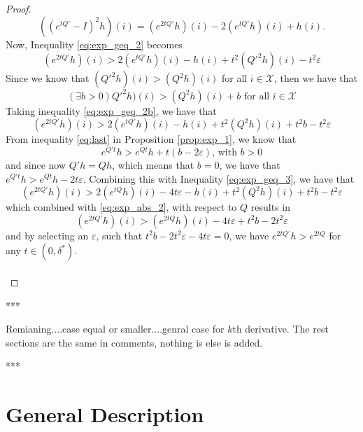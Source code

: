 \documentclass{article}
\newcommand{\statessymbol}{\mathcal{X}}
\newcommand{\stateset}{\statessymbol}
\newcommand{\de}{\delta}
\newcommand{\ve}{\varepsilon}
\begin{document}
\begin{proof}
\begin{equation*}
((e^{tQ'}-I)^{2}h)(i)=(e^{2tQ'}h)(i)-2(e^{tQ'}h)(i)+h(i).
\end{equation*}
Now, Inequality \eqref{eq:exp_geq_2} becomes
\begin{equation} \label{eq:exp_geq_2b}
(e^{2tQ'}h)(i) > 2(e^{tQ'}h)(i)-h(i)+t^{2}(Q'^{2}h)(i)-t^{2}\ve 
\end{equation}
Since we know that $(Q'^{2}h)(i)>(Q^{2}h)(i)$ for all $i\in\stateset$, then we have that
\begin{equation} \label{eq:beta_2}
(\exists b>0) Q'^{2}h)(i)>(Q^{2}h)(i)+b \text{ for all } i\in\stateset
\end{equation} 
Taking inequality \eqref{eq:exp_geq_2b}, we have that
\begin{equation} \label{eq:exp_geq_3}
(e^{2tQ'}h)(i) > 2(e^{tQ'}h)(i)-h(i)+t^{2}(Q^{2}h)(i)+t^{2}b-t^{2}\ve 
\end{equation}
From inequality \eqref{eq:last} in Proposition \ref{prop:exp_1}, we know that
\begin{equation*} 
e^{Q't}h>e^{Qt}h+t(b-2\ve)\text{, with } b>0
\end{equation*}
and since now $Q'h=Qh$, which means that $b=0$, we have that $e^{Q't}h>e^{Qt}h-2t\ve$.
Combining this with Inequality \eqref{eq:exp_geq_3}, we have that
\begin{equation*} 
(e^{2tQ'}h)(i) > 2(e^{tQ}h)(i)-4t\ve-h(i)+t^{2}(Q^{2}h)(i)+t^{2}b-t^{2}\ve 
\end{equation*}
which combined with \eqref{eq:exp_abs_2}, with respect to $Q$ results in
\begin{equation} \label{eq:last_2}
(e^{2tQ'}h)(i) > (e^{2tQ}h)(i)-4t\ve+t^{2}b-2t^{2}\ve 
\end{equation}
and by selecting an $\ve$, such that $t^{2}b-2t^{2}\ve-4t\ve=0$, we have $e^{2tQ'}h>e^{2tQ}$ for any $t\in(0,\de^{*})$.\\\\
\end{proof}

***

Remianing....case equal or smaller....genral case for $k$th derivative.
The rest sections are the same in comments, nothing is else is added.

***


\section{General Description}
\end{document}
